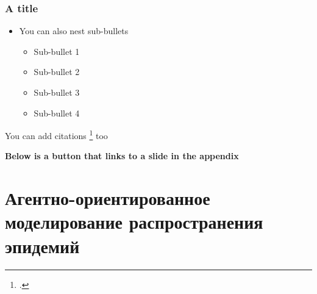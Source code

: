 \documentclass[
    11pt, %
    aspectratio=169, %
]{beamer}
\begin{document}
\begin{frame}
\label{Test} %
	\frametitle{A title}

        \begin{itemize}
            \item You can also nest sub-bullets
            \begin{itemize}
                \item Sub-bullet 1
                \item Sub-bullet 2
                \item Sub-bullet 3
                \item Sub-bullet 4 \newline
            \end{itemize}
        \end{itemize}

        You can add citations \footcite{Tjøstheim} too\newline

        \textbf{Below is a button that links to a slide in the appendix}
        
        \begin{center}
            \hyperlink{Figure}{}    
        \end{center}
\end{frame}

\section{Агентно-ориентированное моделирование распространения эпидемий}
\end{document}
